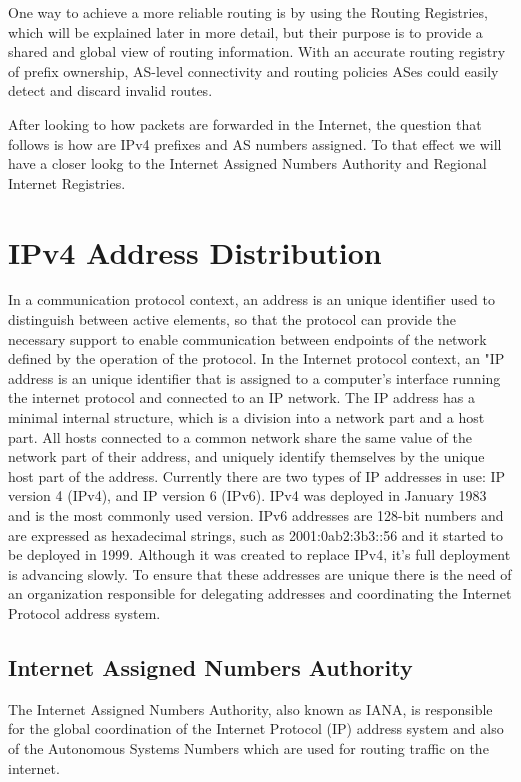 \documentclass[11pt,a4paper]{scrreprt}
\begin{document}
One way to achieve a more reliable routing is by using the Routing Registries, which will be explained later in more detail, but their purpose is to provide a shared and global view of routing information. With an accurate routing registry of prefix ownership, AS-level connectivity and routing policies ASes could easily detect and discard invalid routes.  

After looking to how packets are forwarded in the Internet, the question that follows is how are IPv4 prefixes and AS numbers assigned. To that effect we will have a closer lookg to the Internet Assigned Numbers Authority and Regional Internet Registries.

\section{IPv4 Address Distribution}

In a communication protocol context, an address is an unique identifier used to distinguish between active elements, so that the protocol can provide the necessary support to enable communication between endpoints of the network defined by the operation of the protocol. In the Internet protocol context, an "IP address is an unique identifier that is assigned to a computer's interface running the internet protocol and connected to an IP network. The IP address has a minimal internal structure, which is a division into a network part and a host part. All hosts connected to a common network share the same value of the network part of their address, and uniquely identify themselves by the unique host part of the address. Currently there are two types of IP addresses in use: IP version 4 (IPv4), and IP version 6 (IPv6). IPv4 was deployed in January 1983 and is the most commonly used version. IPv6 addresses are 128-bit numbers and are expressed as hexadecimal strings, such as 2001:0ab2:3b3::56 and it started to be deployed in 1999. Although it was created to replace IPv4, it's full deployment is advancing slowly. 
To ensure that these addresses are unique there is the need of an organization responsible for delegating addresses and coordinating the Internet Protocol address system. 

\subsection{Internet Assigned Numbers Authority}

The Internet Assigned Numbers Authority, also known as IANA, is responsible for the global coordination of the Internet Protocol (IP) address system and also of the Autonomous Systems Numbers which are used for routing traffic on the internet.  
\end{document}
